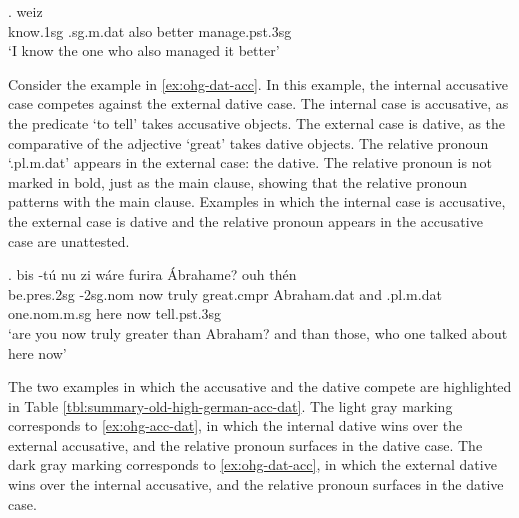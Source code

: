 \exg. weiz    \\
know.1\ac{sg}\scsub{[acc]} .\ac{sg}.\ac{m}.\ac{dat} also better manage.\ac{pst}.3\ac{sg}\scsub{[dat]}\\
`I know the one who also managed it better' \label{ex:ohg-acc-dat}


Consider the example in \ref{ex:ohg-dat-acc}. In this example, the internal accusative case competes against the external dative case.
The internal case is accusative, as the predicate  `to tell' takes accusative objects.
The external case is dative, as the comparative of the adjective  `great' takes dative objects.
The relative pronoun  `.\ac{pl}.\ac{m}.\ac{dat}' appears in the external case: the dative. The relative pronoun is not marked in bold, just as the main clause, showing that the relative pronoun patterns with the main clause.
Examples in which the internal case is accusative, the external case is dative and the relative pronoun appears in the accusative case are unattested.

\exg. bis -tú nu {zi wáre} furira Ábrahame? ouh thén    \\
be.\ac{pres}.2\ac{sg} -2\ac{sg}.\ac{nom} now truly {great}.\ac{cmpr}\scsub{[dat]} Abraham.\ac{dat} and .\ac{pl}.\ac{m}.\ac{dat} one.\ac{nom}.\ac{m}.\ac{sg} here now tell.\ac{pst}.3\ac{sg}\scsub{[acc]}\\
`are you now truly greater than Abraham? and than those, who one talked about here now' \label{ex:ohg-dat-acc}


The two examples in which the accusative and the dative compete are highlighted in Table \ref{tbl:summary-old-high-german-acc-dat}. The light gray marking corresponds to \ref{ex:ohg-acc-dat}, in which the internal dative wins over the external accusative, and the relative pronoun surfaces in the dative case. The dark gray marking corresponds to \ref{ex:ohg-dat-acc}, in which the external dative wins over the internal accusative, and the relative pronoun surfaces in the dative case.

